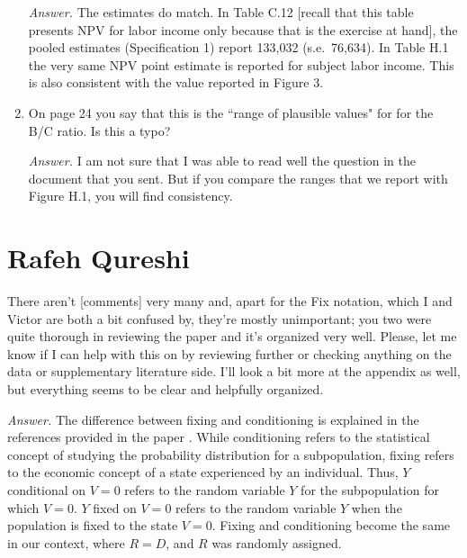 \begin{enumerate}
\noindent \textit{Answer.} The estimates do match. In Table C.12 [recall that this table presents NPV for labor income only because that is the exercise at hand], the pooled estimates (Specification 1) report 133,032 (s.e.\ 76,634). In Table H.1 the very same NPV point estimate is reported for subject labor income. This is also consistent with the value reported in Figure 3. 

\item On page 24 you say that this is the ``range of plausible values" for for the B/C ratio. Is this a typo? 

\noindent \textit{Answer.}  I am not sure that I was able to read well the question in the document that you sent. But if you compare the ranges that we report with Figure H.1, you will find consistency.
\end{enumerate}

\section{Rafeh Qureshi}

There aren't [comments] very many and, apart for the Fix notation, which I and Victor are both a bit confused by, they're mostly unimportant; you two were quite thorough in reviewing the paper and it's organized very well. Please, let me know if I can help with this on by reviewing further or checking anything on the data or supplementary literature side. I'll look a bit more at the appendix as well, but everything seems to be clear and helpfully organized.

\textit{Answer.} The difference between fixing and conditioning is explained in the references provided in the paper \citep{Heckman_Pinto_2015_EconometTheory}. While conditioning refers to the statistical concept of studying the probability distribution for a subpopulation, fixing refers to the economic concept of a state experienced by an individual. Thus, $Y$ conditional on $V = 0$ refers to the random variable $Y$ for the subpopulation for which $V = 0$. $Y$ fixed on $V = 0$ refers to the random variable $Y$ when the population is fixed to the state $V = 0$. Fixing and conditioning become the same in our context, where $R = D$, and $R$ was randomly assigned.

\singlespace





